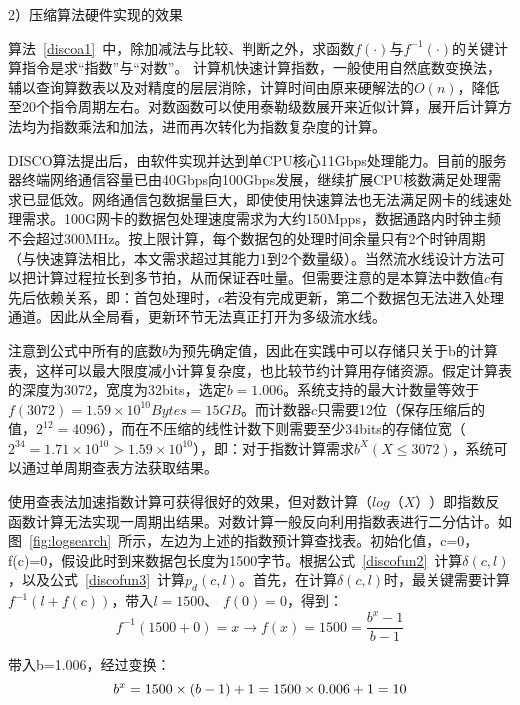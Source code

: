 2）压缩算法硬件实现的效果

算法~\ref{discoa1}~中，除加减法与比较、判断之外，求函数$ f(\cdot)$与$ f^{-1}(\cdot) $的关键计算指令是求“指数”与“对数”。 计算机快速计算指数，一般使用自然底数变换法，辅以查询算数表以及对精度的层层消除，计算时间由原来硬解法的$ O(n) $，降低至20个指令周期左右。对数函数可以使用泰勒级数展开来近似计算，展开后计算方法均为指数乘法和加法，进而再次转化为指数复杂度的计算。

DISCO算法提出后，由软件实现并达到单CPU核心11Gbps处理能力。目前的服务器终端网络通信容量已由40Gbps向100Gbps发展，继续扩展CPU核数满足处理需求已显低效。网络通信包数据量巨大，即使使用快速算法也无法满足网卡的线速处理需求。100G网卡的数据包处理速度需求为大约150Mpps，数据通路内时钟主频不会超过300MHz。按上限计算，每个数据包的处理时间余量只有2个时钟周期（与快速算法相比，本文需求超过其能力1到2个数量级）。当然流水线设计方法可以把计算过程拉长到多节拍，从而保证吞吐量。但需要注意的是本算法中数值$ c $有先后依赖关系，即：首包处理时，$ c $若没有完成更新，第二个数据包无法进入处理通道。因此从全局看，更新环节无法真正打开为多级流水线。

注意到公式中所有的底数$ b $为预先确定值，因此在实践中可以存储只关于b的计算表，这样可以最大限度减小计算复杂度，也比较节约计算用存储资源。假定计算表的深度为3072，宽度为32bits，选定$ b=1.006 $。系统支持的最大计数量等效于$ f(3072)=1.59\times10^{10}Bytes=15GB $。而计数器$ c $只需要12位（保存压缩后的值，$ 2^{12}=4096 $），而在不压缩的线性计数下则需要至少34bits的存储位宽（$ 2^{34}=1.71\times10^{10}>1.59\times10^{10}$），即：对于指数计算需求$b^X (X \leq 3072)$，系统可以通过单周期查表方法获取结果。


使用查表法加速指数计算可获得很好的效果，但对数计算（$ log（X） $）即指数反函数计算无法实现一周期出结果。对数计算一般反向利用指数表进行二分估计。如图~\ref{fig:logsearch}~所示，左边为上述的指数预计算查找表。初始化值，c=0，f(c)=0，假设此时到来数据包长度为1500字节。根据公式~\ref{discofun2}~计算$ \delta(c,l)$，以及公式~\ref{discofun3}~计算$p_d(c,l) $。首先，在计算$ \delta(c,l)$时，最关键需要计算 $ f^{-1}(l+f(c)) $，带入$ l=1500 $、 $ f(0)=0 $，得到：
\begin{equation} \label{discofun4}
f^{-1}(1500+0) = x \rightarrow f(x)=1500 = \dfrac{b^x-1}{b-1}
\end{equation}

带入b=1.006，经过变换：
\begin{equation} \label{discofun5}
b^x=1500\times(b-1)+1\\
= 1500\times 0.006+1\\
=10
\end{equation}

